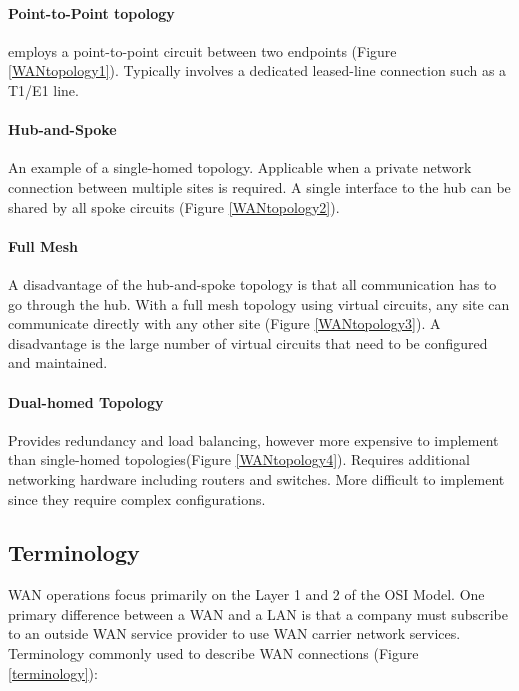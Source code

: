 \paragraph{Point-to-Point topology} employs a point-to-point circuit between two endpoints (Figure \ref{WANtopology1}). Typically involves a dedicated leased-line connection such as a T1/E1 line.
\paragraph{Hub-and-Spoke} An example of a single-homed topology. Applicable when a private network connection between multiple sites is required. A single interface to the hub can be shared by all spoke circuits (Figure \ref{WANtopology2}).
\paragraph{Full Mesh} A disadvantage of the hub-and-spoke topology is that all communication has to go through the hub. With a full mesh topology using virtual circuits, any site can communicate directly with any other site (Figure \ref{WANtopology3}). A disadvantage is the large number of virtual circuits that need to be configured and maintained.
\paragraph{Dual-homed Topology} Provides redundancy and load balancing, however more expensive to implement than single-homed topologies(Figure \ref{WANtopology4}). Requires additional networking hardware including routers and switches. More difficult to implement since they require complex configurations.


\subsection{Terminology}

WAN operations focus primarily on the Layer 1 and 2 of the OSI Model. One primary difference between a WAN and a LAN is that a company must subscribe to an outside WAN service provider to use WAN carrier network services.\\

Terminology commonly used to describe WAN connections (Figure \ref{terminology}):

